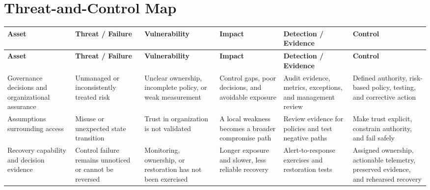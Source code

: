 \documentclass[11pt,letterpaper]{article}
\begin{document}
\section*{Threat-and-Control Map}
\begingroup\scriptsize\setlength{\tabcolsep}{2pt}
\begin{longtable}{>{\raggedright\arraybackslash}p{}>{\raggedright\arraybackslash}p{}>{\raggedright\arraybackslash}p{}>{\raggedright\arraybackslash}p{}>{\raggedright\arraybackslash}p{}>{\raggedright\arraybackslash}p{}}
\toprule\rowcolor{Navy}\color{white}\textbf{Asset} & \color{white}\textbf{Threat / Failure} & \color{white}\textbf{Vulnerability} & \color{white}\textbf{Impact} & \color{white}\textbf{Detection / Evidence} & \color{white}\textbf{Control}\\\midrule
\endfirsthead
\toprule\rowcolor{Navy}\color{white}\textbf{Asset} & \color{white}\textbf{Threat / Failure} & \color{white}\textbf{Vulnerability} & \color{white}\textbf{Impact} & \color{white}\textbf{Detection / Evidence} & \color{white}\textbf{Control}\\\midrule
\endhead
Governance decisions and organizational assurance & Unmanaged or inconsistently treated risk & Unclear ownership, incomplete policy, or weak measurement & Control gaps, poor decisions, and avoidable exposure & Audit evidence, metrics, exceptions, and management review & Defined authority, risk-based policy, testing, and corrective action\\\midrule
Assumptions surrounding access & Misuse or unexpected state transition & Trust in organization is not validated & A local weakness becomes a broader compromise path & Review evidence for policies and test negative paths & Make trust explicit, constrain authority, and fail safely\\\midrule
Recovery capability and decision evidence & Control failure remains unnoticed or cannot be reversed & Monitoring, ownership, or restoration has not been exercised & Longer exposure and slower, less reliable recovery & Alert-to-response exercises and restoration tests & Assigned ownership, actionable telemetry, preserved evidence, and rehearsed recovery\\\midrule
\bottomrule
\end{longtable}
\endgroup
\end{document}
